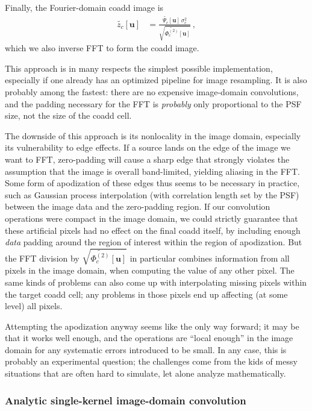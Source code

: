 \documentclass[DM,authoryear,toc]{lsstdoc}
\begin{document}
Finally, the Fourier-domain coadd image is
\begin{align}
    \widetilde{z_c}[\symbf{u}] &= \frac{
        \widetilde{\Psi_c}[\symbf{u}] \, \sigma_c^2
    }{
        \sqrt{\widetilde{\Phi_c^{(2)}}[\symbf{u}]}
    } \, ,
\end{align}
which we also inverse FFT to form the coadd image.

This approach is in many respects the simplest possible implementation, especially if one already has an optimized pipeline for image resampling.
It is also probably among the fastest: there are no expensive image-domain convolutions, and the padding necessary for the FFT is \emph{probably} only proportional to the PSF size, not the size of the coadd cell.

The downside of this approach is its nonlocality in the image domain, especially its vulnerability to edge effects.
If a source lands on the edge of the image we want to FFT, zero-padding will cause a sharp edge that strongly violates the assumption that the image is overall band-limited, yielding aliasing in the FFT.
Some form of apodization of these edges thus seems to be necessary in practice, such as Gaussian process interpolation (with correlation length set by the PSF) between the image data and the zero-padding region.
If our convolution operations were compact in the image domain, we could strictly guarantee that these artificial pixels had no effect on the final coadd itself, by including enough \emph{data} padding around the region of interest within the region of apodization.
But the FFT division by $\sqrt{\widetilde{\Phi_c^{(2)}}[\symbf{u}]}$ in particular combines information from all pixels in the image domain, when computing the value of any other pixel.
The same kinds of problems can also come up with interpolating missing pixels within the target coadd cell; any problems in those pixels end up affecting (at some level) all pixels.

Attempting the apodization anyway seems like the only way forward; it may be that it works well enough, and the operations are ``local enough'' in the image domain for any systematic errors introduced to be small.
In any case, this is probably an experimental question; the challenges come from the kids of messy situations that are often hard to simulate, let alone analyze mathematically.

\subsubsection{Analytic single-kernel image-domain convolution}
\end{document}
